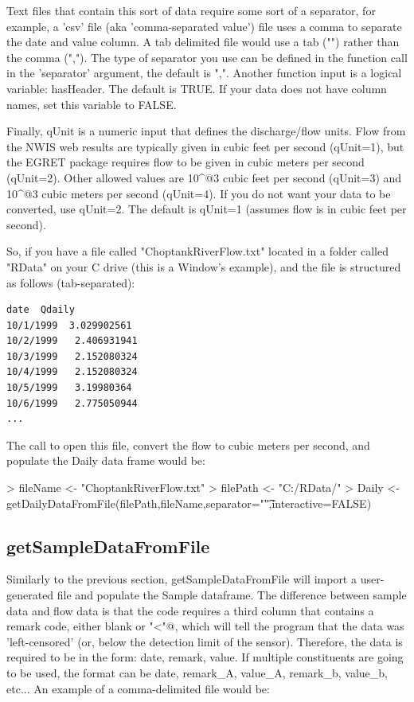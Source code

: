 \documentclass[a4paper,11pt]{article}
\begin{document}
Text files that contain this sort of data require some sort of a separator, for example, a 'csv' file (aka 'comma-separated value') file uses a comma to separate the date and value column. A tab delimited file would use a tab ("\verb@\t@") rather than the comma (","). The type of separator you use can be defined in the function call in the 'separator' argument, the default is ",". Another function input is a logical variable: hasHeader.  The default is TRUE. If your data does not have column names, set this variable to FALSE.

Finally, qUnit is a numeric input that defines the discharge/flow units. Flow from the NWIS web results are typically given in cubic feet per second (qUnit=1), but the EGRET package requires flow to be given in cubic meters per second (qUnit=2). Other allowed values are 10\verb@^@3 cubic feet per second (qUnit=3) and 10\verb@^@3 cubic meters per second (qUnit=4). If you do not want your data to be converted, use qUnit=2. The default is qUnit=1 (assumes flow is in cubic feet per second).

So, if you have a file called "ChoptankRiverFlow.txt" located in a folder called "RData" on your C drive (this is a Window's example), and the file is structured as follows (tab-separated):
\begin{verbatim}
date  Qdaily
10/1/1999  3.029902561
10/2/1999	2.406931941
10/3/1999	2.152080324
10/4/1999	2.152080324
10/5/1999	3.19980364
10/6/1999	2.775050944
...
\end{verbatim}

The call to open this file, convert the flow to cubic meters per second, and populate the Daily data frame would be:
\begin{Schunk}
\begin{Sinput}
> fileName <- "ChoptankRiverFlow.txt"
> filePath <-  "C:/RData/"
> Daily <- getDailyDataFromFile(filePath,fileName,separator="\t",interactive=FALSE)
\end{Sinput}
\end{Schunk}

\subsection{getSampleDataFromFile}
Similarly to the previous section, getSampleDataFromFile will import a user-generated file and populate the Sample dataframe. The difference between sample data and flow data is that the code requires a third column that contains a remark code, either blank or \verb@"<"@, which will tell the program that the data was 'left-censored' (or, below the detection limit of the sensor). Therefore, the data is required to be in the form: date, remark, value.  If multiple constituents are going to be used, the format can be date, remark\_A, value\_A, remark\_b, value\_b, etc... An example of a comma-delimited file would be:
\end{document}
